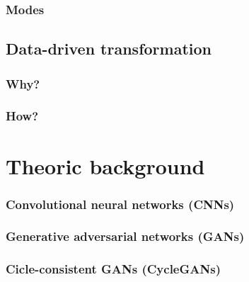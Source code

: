 \documentclass{beamer}
\begin{document}
\begin{frame}
\frametitle{Modes}
\end{frame}

\subsection{Data-driven transformation}


\begin{frame}
\frametitle{Why?}

\end{frame}

\begin{frame}

\frametitle{How?}
\end{frame}


\section{Theoric background}

\begin{frame}
\frametitle{Convolutional neural networks (CNNs)}
\end{frame}

\begin{frame}
\frametitle{Generative adversarial networks (GANs)}
\end{frame}

\begin{frame}
\frametitle{Cicle-consistent GANs (CycleGANs)}
\end{frame}
\end{document}
